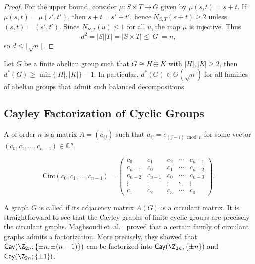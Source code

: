 \documentclass{file}
\newcommand{\cay}{\mathop{\mathsf{Cay}}}
\begin{document}
\begin{proof}
For the upper bound, consider $\mu:S\times T\to G$ given by $\mu(s,t)=s+t$. If $\mu(s,t)=\mu(s',t')$, then $s+t=s'+t'$, hence $N_{S,T}(s+t)\ge 2$ unless $(s,t)=(s',t')$. Since $N_{S,T}(u)\le 1$ for all $u$, the map $\mu$ is injective. Thus
\[
d^2=|S||T|=|S\times T|\le |G|=n,
\]
so $d\le \lfloor \sqrt{n}\rfloor$.
\end{proof}

\begin{cor}
Let $G$ be a finite abelian group such that $G\cong H\oplus K$ with $|H|,|K|\ge2$, then
$d^*(G)\ge \min\{|H|,|K|\}-1$. 
In particular, $d^*(G)\in \Theta(\sqrt{n})$ for all families of abelian groups that admit such balanced decompositions.
\end{cor}
\subsection{Cayley Factorization of Cyclic Groups}

A  of order $n$ is a matrix $A = (a_{ij})$ such that 
$a_{ij} = c_{(j-i)\bmod n}$ for some vector $(c_0, c_1, \dots, c_{n-1}) \in \mathbb{C}^n$.

\[
\mathrm{Circ}(c_0, c_1, \dots, c_{n-1}) =
\begin{pmatrix}
c_0 & c_1 & c_2 & \cdots & c_{n-1} \\
c_{n-1} & c_0 & c_1 & \cdots & c_{n-2} \\
c_{n-2} & c_{n-1} & c_0 & \cdots & c_{n-3} \\
\vdots & \vdots & \vdots & \ddots & \vdots \\
c_1 & c_2 & c_3 & \cdots & c_0
\end{pmatrix}.
\]

A graph $ G $ is called  if its adjacency matrix $ A(G) $ is a circulant matrix.  
It is straightforward to see that the Cayley graphs of finite cyclic groups are precisely the circulant graphs.  
Maghsoudi et~al.~\cite{maghsoudi2023matrix} proved that a certain family of circulant graphs admits a factorization.  
More precisely, they showed that 
$\cay(\Z_{2n};\{\pm n, \pm (n-1)\})$
can be factorized into 
$\cay(\Z_{2n};\{\pm n\})$ and $\cay(\Z_{2n};\{\pm 1\})$.
\end{document}
